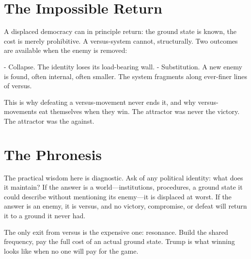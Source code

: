 \documentclass[12pt]{article}
\begin{document}
\section{The Impossible Return}

A displaced democracy can in principle return: the ground state is known, the cost is merely prohibitive. A versus-system cannot, structurally. Two outcomes are available when the enemy is removed:

- Collapse. The identity loses its load-bearing wall.
- Substitution. A new enemy is found, often internal, often smaller. The system fragments along ever-finer lines of versus.

This is why defeating a versus-movement never ends it, and why versus-movements eat themselves when they win. The attractor was never the victory. The attractor was the against.

\section{The Phronesis}

The practical wisdom here is diagnostic. Ask of any political identity: what does it maintain? If the answer is a world---institutions, procedures, a ground state it could describe without mentioning its enemy---it is displaced at worst. If the answer is an enemy, it is versus, and no victory, compromise, or defeat will return it to a ground it never had.

The only exit from versus is the expensive one: resonance. Build the shared frequency, pay the full cost of an actual ground state. Trump is what winning looks like when no one will pay for the game.
\end{document}
